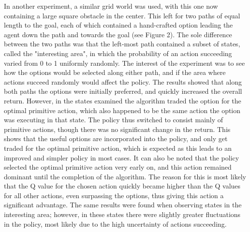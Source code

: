 \documentclass{acm_proc_article-sp}
\begin{document}
In another experiment, a similar grid world was used, with this one now containing a large square obstacle in the center. This left for two paths of equal length to the goal, each of which contained a hand-crafted option leading the agent down the path and towards the goal (see Figure 2). The sole difference between the two paths was that the left-most path contained a subset of states, called the "interesting area", in which the probability of an action succeeding varied from 0 to 1 uniformly randomly.
	 The interest of the experiment was to see how the options would be selected along either path, and if the area where actions succeed randomly would affect the policy. The results showed that along both paths the options were initially preferred, and quickly increased the overall return. 
	 However, in the states examined the algorithm traded the option for the optimal primitive action, which also happened to be the same action the option was executing in that state. The policy thus switched to consist mainly of primitive actions, though there was no significant change in the return. This shows that the useful options are incorporated into the policy, and only get traded for the optimal primitive action, which is expected as this leads to an improved and simpler policy in most cases.
	  It can also be noted that the policy selected the optimal primitive action very early on, and this action remained dominant until the completion of the algorithm. The reason for this is most likely that the Q value for the chosen action quickly became higher than the Q values for all other actions, even surpassing the options, thus giving this action a significant advantage.
	  The same results were found when observing states in the interesting area; however, in these states there were slightly greater fluctuations in the policy, most likely due to the high uncertainty of actions succeeding.
	  
\end{document}

